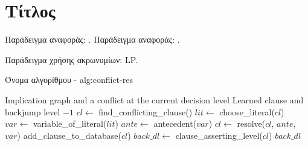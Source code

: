 \section{Τίτλος}
Παράδειγμα αναφοράς: \cite{BALABANOVJIANG2012}.
Παράδειγμα αναφοράς: \cite{papadopoulos2020}.

Παράδειγμα χρήσης ακρωνυμίων: \ac{LP}.

\begin{myalgorithm}{Όνομα αλγορίθμου - }{alg:conflict-res}
\begin{algorithmic}[1]
        \Require Implication graph and a conflict at the current decision level
        \Ensure Learned clause and backjump level
                \State \Return $-1$
            \EndIf
            \State $cl \gets$ find\_conflicting\_clause()
                \State $lit \gets$ choose\_literal($cl$)
                \State $var \gets$ variable\_of\_literal($lit$)
                \State $ante \gets$ antecedent($var$)
                \State $cl \gets$ resolve($cl$, $ante$, $var$)
            \EndWhile
            \State add\_clause\_to\_database($cl$)
            \State $back\_dl \gets$ clause\_asserting\_level($cl$)
            \State \Return $back\_dl$
        \EndFunction
    \end{algorithmic}
\end{myalgorithm}
